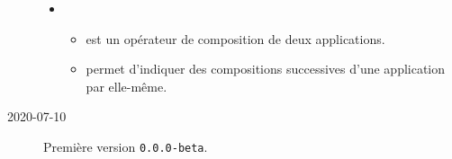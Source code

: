 \documentclass[12pt,a4paper]{article}
\begin{document}
\begin{description}
    \begin{itemize}[itemsep=.5em]
        \item {}
        \begin{itemize}[itemsep=.5em]
            \item {} est un opérateur de composition de deux applications.
    
            \item {} permet d'indiquer des compositions successives d'une application par elle-même.
        \end{itemize}
    \end{itemize}
    
    \separation


    \medskip
    \item[2020-07-10] Première version \verb+0.0.0-beta+.

\end{description}
\end{document}
